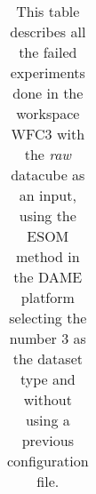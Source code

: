 \documentclass[11pt,fleqn]{book} %
\begin{document}
\begin{table}[h!]
\begin{tabular}{ c c c c c c }
																																																																																																																																																																																																																																						      \hline
																																																																																																																																																																																																																																						        \end{tabular}
																																																																																																																																																																																																																																							  \caption{This table describes all the failed experiments done in the workspace WFC3 with the \emph{raw} datacube as an input, using the ESOM method in the DAME platform selecting the number 3 as the dataset type and without using a previous configuration file.}
																																																																																																																																																																																																																																							    \label{tab:ds9failed}
																																																																																																																																																																																																																																							    \end{table}
\end{document}
